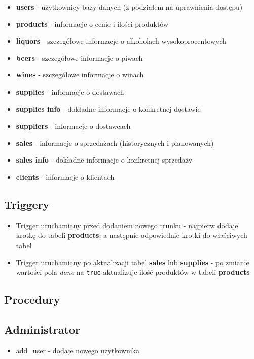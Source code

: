 \documentclass[12pt,a4paper]{article}
\begin{document}
    \begin{itemize}
        \item \textbf{users} - użytkownicy bazy danych (z podziałem na uprawnienia dostępu)
        \item \textbf{products} - informacje o cenie i ilości produktów
        \item \textbf{liquors} - szczegółowe informacje o alkoholach wysokoprocentowych
        \item \textbf{beers} - szczegółowe informacje o piwach
        \item \textbf{wines} - szczegółowe informacje o winach
        \item \textbf{supplies} - informacje o dostawach
        \item \textbf{supplies info} - dokładne informacje o konkretnej dostawie
        \item \textbf{suppliers} - informacje o dostawcach
        \item \textbf{sales} - informacje o sprzedażach (historycznych i planowanych)
        \item \textbf{sales info} - dokładne informacje o konkretnej sprzedaży
        \item \textbf{clients} - informacje o klientach
    \end{itemize}
    
\subsection*{Triggery}

    \begin{itemize}
        \item Trigger uruchamiany przed dodaniem nowego trunku - najpierw dodaje krotkę do tabeli \textbf{products}, a następnie odpowiednie krotki do właściwych tabel
        \item Trigger uruchamiany po aktualizacji tabel \textbf{sales} lub \textbf{supplies} - po zmianie wartości pola \textit{done} na \texttt{true} aktualizuje ilość produktów w tabeli \textbf{products}
    \end{itemize}        

\subsection*{Procedury}

    \subsection*{Administrator}
        \begin{itemize}
            \item \textsf{add\_user} - dodaje nowego użytkownika
        \end{itemize}
\end{document}

